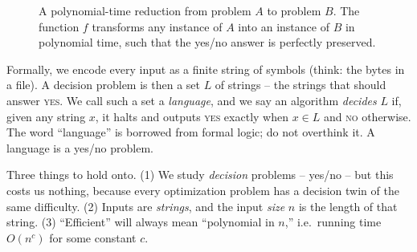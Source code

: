 \begin{figure}[h]
\centering
{}
\caption{A polynomial-time reduction from problem $A$ to problem $B$. The function $f$ transforms any instance of $A$ into an instance of $B$ in polynomial time, such that the yes/no answer is perfectly preserved.}
\label{ch33:fig-reduction}
\end{figure}


Formally, we encode every input as a finite string of symbols (think: the bytes
in a file). A decision problem is then a set $L$ of strings -- the strings
that should answer \textsc{yes}. We call such a set a \emph{language}, and we say
an algorithm \emph{decides} $L$ if, given any string $x$, it halts and outputs
\textsc{yes} exactly when $x \in L$ and \textsc{no} otherwise. The word
``language'' is borrowed from formal logic; do not overthink it. A language is a
yes/no problem.

\begin{focusbox}
Three things to hold onto. (1) We study \emph{decision} problems -- yes/no -- but
this costs us nothing, because every optimization problem has a decision twin of
the same difficulty. (2) Inputs are \emph{strings}, and the input \emph{size}
$n$ is the length of that string. (3) ``Efficient'' will always mean
``polynomial in $n$,'' i.e.\ running time $O(n^c)$ for some constant $c$.
\end{focusbox}

